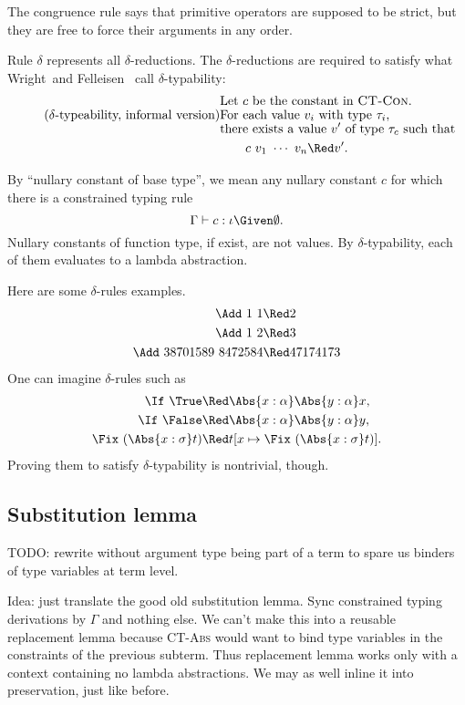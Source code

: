 \documentclass{amsart}
\theoremstyle{definition}
\begin{document}
The congruence rule  says that primitive operators
are supposed to be strict, but they are free to force their
arguments in any order.

Rule \textsc{$\delta$} represents all $\delta$-reductions. The
$\delta$-reductions are required to satisfy what
Wright~and Felleisen~\cite{Wright94} call $\delta$-typability:
\begin{align*}
&\text{Let $c$ be the constant in \textsc{CT-Con}.}\\[-4pt]
\tag{$\delta$-typeability, informal version}\label{delta-typability}
&\text{For each value $v_i$ with type $\tau_i$,}\\[-4pt]
&\text{there exists a value $v'$ of type $\tau_c$ such that}\\
&\hspace{2em}c~v_1~\cdots~v_n\Red v'.
\end{align*}

By ``nullary constant of base type'', we mean any nullary
constant $c$ for which there is a constrained typing rule
\[
\Gamma\vdash c:\iota\Given\emptyset.
\]
Nullary constants of function type, if exist, are not values. By
$\delta$-typability, each of them evaluates to a lambda
abstraction.

Here are some $\delta$-rules examples.
\begin{align*}
\Add~1~1&\Red2\\
\Add~1~2&\Red3\\
\Add~38701589~8472584&\Red47174173
\end{align*}
One can imagine $\delta$-rules such as
\begin{align*}
\If~\True &\Red\Abs{x:\alpha}\Abs{y:\alpha}x,\\
\If~\False&\Red\Abs{x:\alpha}\Abs{y:\alpha}y,\\
\Fix~(\Abs{x:\sigma} t)&\Red t[x\mapsto \Fix~(\Abs{x:\sigma} t)].
\end{align*}
Proving them to satisfy $\delta$-typability is nontrivial,
though.

\subsection{Substitution lemma}

TODO: rewrite without argument type being part of a term to spare
us binders of type variables at term level.

Idea: just translate the good old substitution lemma. Sync
constrained typing derivations by $\Gamma$ and nothing else. We
can't make this into a reusable replacement lemma because
\textsc{CT-Abs} would want to bind type variables in the
constraints of the previous subterm. Thus replacement lemma works
only with a context containing no lambda abstractions. We may as
well inline it into preservation, just like before.


\end{document}
